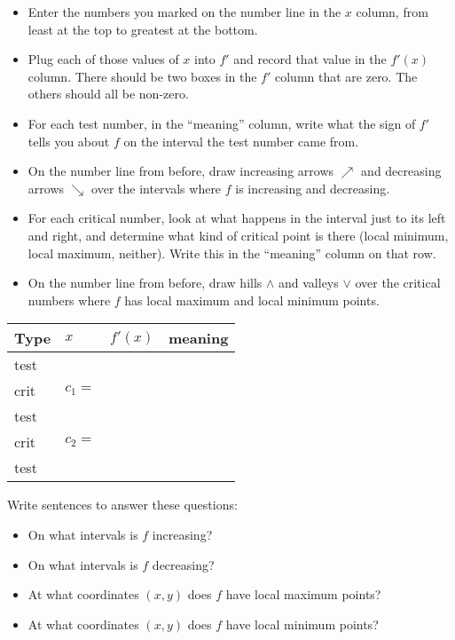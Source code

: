 \begin{ProblemSet}
 \begin{Problem}[pencil space=0in]
  \begin{itemize}
  \item Enter the numbers you marked on the number line in the $x$ column, from least at the top to greatest at the bottom.
  \item Plug each of those values of $x$ into $f'$ and record that value in the $f'(x)$ column.
   There should be two boxes in the $f'$ column that are zero.
   The others should all be non-zero.
  \item For each test number, in the ``meaning'' column, write what the sign of $f'$ tells you about $f$ on the interval the test number came from.
  \item On the number line from before, draw increasing arrows $\nearrow$ and decreasing arrows $\searrow$ over the intervals where $f$ is increasing and decreasing.
  \item For each critical number, look at what happens in the interval just to its left and right, and determine what kind of critical point is there (local minimum, local maximum, neither).
   Write this in the ``meaning'' column on that row.
  \item On the number line from before, draw hills $\wedge$ and valleys $\vee$ over the critical numbers where $f$ has local maximum and local minimum points.
  \end{itemize}
  \bigskip

  \newcommand{\Bx}[1]{\Strut[-0.25in]{0.75in}#1}
  \begin{tabular}{l|p{1in}|p{1in}|p{3in}}
    Type & $x$ & $f'(x)$ & meaning
    \\ \hline
    \Bx{test} & & &
    \\ \hline
    \Bx{crit} & \Bx{$c_1 = $} & &
    \\ \hline
    \Bx{test} & & &
    \\ \hline
    \Bx{crit} & \Bx{$c_2 = $} & &
    \\ \hline
    \Bx{test} & & &
    \\ \hline
  \end{tabular}

 \end{Problem}

 \begin{Problem}[pencil space=2.5in]
  Write sentences to answer these questions:
  \begin{itemize}
  \item On what intervals is $f$ increasing?
  \item On what intervals is $f$ decreasing?
  \item At what coordinates $(x,y)$ does $f$ have local maximum points?
  \item At what coordinates $(x,y)$ does $f$ have local minimum points?
  \end{itemize}
 \end{Problem}


\end{ProblemSet}
